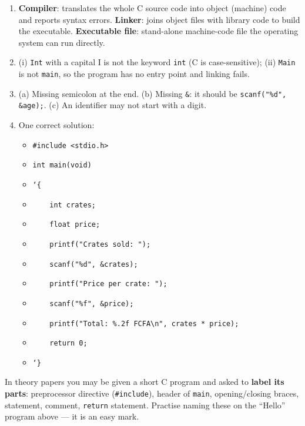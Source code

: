 \documentclass[11pt]{article}
\begin{document}
\begin{corrige}[Exercise 1]
\begin{enumerate}
\item \textbf{Compiler}: translates the whole C source code into object (machine) code and reports syntax errors. \textbf{Linker}: joins object files with library code to build the executable. \textbf{Executable file}: stand-alone machine-code file the operating system can run directly.
\item (i) \texttt{Int} with a capital I is not the keyword \texttt{int} (C is case-sensitive); (ii) \texttt{Main} is not \texttt{main}, so the program has no entry point and linking fails.
\item (a) Missing semicolon at the end. (b) Missing \texttt{\&}: it should be \texttt{scanf("\%d", \&age);}. (c) An identifier may not start with a digit.
\item One correct solution:
\begin{itemize}
\item[] \texttt{\#include <stdio.h>}
\item[] \texttt{int main(void)}
\item[] \texttt{\char`\{}
\item[] \texttt{\ \ \ \ int crates;}
\item[] \texttt{\ \ \ \ float price;}
\item[] \texttt{\ \ \ \ printf("Crates sold: ");}
\item[] \texttt{\ \ \ \ scanf("\%d", \&crates);}
\item[] \texttt{\ \ \ \ printf("Price per crate: ");}
\item[] \texttt{\ \ \ \ scanf("\%f", \&price);}
\item[] \texttt{\ \ \ \ printf("Total: \%.2f FCFA\textbackslash n", crates * price);}
\item[] \texttt{\ \ \ \ return 0;}
\item[] \texttt{\char`\}}
\end{itemize}
\end{enumerate}
\end{corrige}

\begin{attention}
In theory papers you may be given a short C program and asked to \textbf{label its parts}: preprocessor directive (\texttt{\#include}), header of \texttt{main}, opening/closing braces, statement, comment, \texttt{return} statement. Practise naming these on the ``Hello'' program above — it is an easy mark.
\end{attention}
\end{document}
